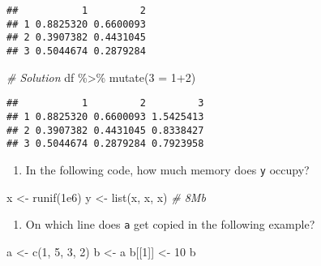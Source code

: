 \documentclass[
]{article}
\newenvironment{Shaded}{\begin{snugshade}}{\end{snugshade}}
\newcommand{\AttributeTok}[1]{\textcolor[rgb]{0.77,0.63,0.00}{#1}}
\newcommand{\CommentTok}[1]{\textcolor[rgb]{0.56,0.35,0.01}{\textit{#1}}}
\newcommand{\DecValTok}[1]{\textcolor[rgb]{0.00,0.00,0.81}{#1}}
\newcommand{\FloatTok}[1]{\textcolor[rgb]{0.00,0.00,0.81}{#1}}
\newcommand{\FunctionTok}[1]{\textcolor[rgb]{0.00,0.00,0.00}{#1}}
\newcommand{\NormalTok}[1]{#1}
\newcommand{\OtherTok}[1]{\textcolor[rgb]{0.56,0.35,0.01}{#1}}
\newcommand{\SpecialCharTok}[1]{\textcolor[rgb]{0.00,0.00,0.00}{#1}}
\newcommand{\StringTok}[1]{\textcolor[rgb]{0.31,0.60,0.02}{#1}}
\providecommand{\tightlist}{%
  \setlength{\itemsep}{0pt}\setlength{\parskip}{0pt}}
\begin{document}
\begin{verbatim}
##           1         2
## 1 0.8825320 0.6600093
## 2 0.3907382 0.4431045
## 3 0.5044674 0.2879284
\end{verbatim}

\begin{Shaded}
\begin{Highlighting}[]
\CommentTok{\# Solution}
\NormalTok{df }\SpecialCharTok{\%\textgreater{}\%}
  \FunctionTok{mutate}\NormalTok{(}\StringTok{\textasciigrave{}}\AttributeTok{3}\StringTok{\textasciigrave{}} \OtherTok{=} \StringTok{\textasciigrave{}}\AttributeTok{1}\StringTok{\textasciigrave{}}\SpecialCharTok{+}\StringTok{\textasciigrave{}}\AttributeTok{2}\StringTok{\textasciigrave{}}\NormalTok{)}
\end{Highlighting}
\end{Shaded}

\begin{verbatim}
##           1         2         3
## 1 0.8825320 0.6600093 1.5425413
## 2 0.3907382 0.4431045 0.8338427
## 3 0.5044674 0.2879284 0.7923958
\end{verbatim}

\begin{enumerate}
\def\labelenumi{\arabic{enumi}.}
\setcounter{enumi}{1}
\tightlist
\item
  In the following code, how much memory does \texttt{y} occupy?
\end{enumerate}

\begin{Shaded}
\begin{Highlighting}[]
\NormalTok{x }\OtherTok{\textless{}{-}} \FunctionTok{runif}\NormalTok{(}\FloatTok{1e6}\NormalTok{)}
\NormalTok{y }\OtherTok{\textless{}{-}} \FunctionTok{list}\NormalTok{(x, x, x) }\CommentTok{\# 8Mb}
\end{Highlighting}
\end{Shaded}

\begin{enumerate}
\def\labelenumi{\arabic{enumi}.}
\setcounter{enumi}{2}
\tightlist
\item
  On which line does \texttt{a} get copied in the following example?
\end{enumerate}

\begin{Shaded}
\begin{Highlighting}[]
\NormalTok{a }\OtherTok{\textless{}{-}} \FunctionTok{c}\NormalTok{(}\DecValTok{1}\NormalTok{, }\DecValTok{5}\NormalTok{, }\DecValTok{3}\NormalTok{, }\DecValTok{2}\NormalTok{)}
\NormalTok{b }\OtherTok{\textless{}{-}}\NormalTok{ a}
\NormalTok{b[[}\DecValTok{1}\NormalTok{]] }\OtherTok{\textless{}{-}} \DecValTok{10}
\NormalTok{b}
\end{Highlighting}
\end{Shaded}
\end{document}
